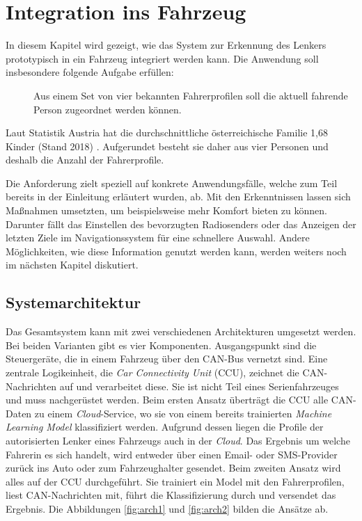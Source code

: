 %
%
%
%
%


\chapter{Integration ins Fahrzeug}
\label{chap:car_integration}

In diesem Kapitel wird gezeigt, wie das System zur Erkennung des Lenkers prototypisch in ein Fahrzeug integriert werden kann. Die Anwendung soll insbesondere folgende Aufgabe erfüllen:

\begin{description}
    \item[] Aus einem Set von vier bekannten Fahrerprofilen soll die aktuell fahrende Person zugeordnet werden können.
\end{description}

Laut Statistik Austria hat die durchschnittliche österreichische Familie 1,68 Kinder (Stand 2018) \cite{Stat2018}. Aufgerundet besteht sie daher aus vier Personen und deshalb die Anzahl der Fahrerprofile.

Die Anforderung zielt speziell auf konkrete Anwendungsfälle, welche zum Teil bereits in der Einleitung erläutert wurden, ab. Mit den Erkenntnissen lassen sich Maßnahmen umsetzten, um beispielsweise mehr Komfort bieten zu können. Darunter fällt das Einstellen des bevorzugten Radiosenders oder das Anzeigen der letzten Ziele im Navigationssystem für eine schnellere Auswahl. Andere Möglichkeiten, wie diese Information genutzt werden kann, werden weiters noch im nächsten Kapitel diskutiert.

\section{Systemarchitektur}
\label{sec:architecture}

Das Gesamtsystem kann mit zwei verschiedenen Architekturen umgesetzt werden. Bei beiden Varianten gibt es vier Komponenten. Ausgangspunkt sind die Steuergeräte, die in einem Fahrzeug über den CAN-Bus vernetzt sind. Eine zentrale Logikeinheit, die \textit{Car Connectivity Unit} (CCU), zeichnet die CAN-Nachrichten auf und verarbeitet diese. Sie ist nicht Teil eines Serienfahrzeuges und muss nachgerüstet werden. Beim ersten Ansatz überträgt die CCU alle CAN-Daten zu einem \textit{Cloud}-Service, wo sie von einem bereits trainierten \textit{Machine Learning Model} klassifiziert werden. Aufgrund dessen liegen die Profile der autorisierten Lenker eines Fahrzeugs auch in der \textit{Cloud}. Das Ergebnis um welche Fahrerin es sich handelt, wird entweder über einen Email- oder SMS-Provider zurück ins Auto oder zum Fahrzeughalter gesendet. Beim zweiten Ansatz wird alles auf der CCU durchgeführt. Sie trainiert ein Model mit den Fahrerprofilen, liest CAN-Nachrichten mit, führt die Klassifizierung durch und versendet das Ergebnis. Die Abbildungen \ref{fig:arch1} und \ref{fig:arch2} bilden die Ansätze ab.


